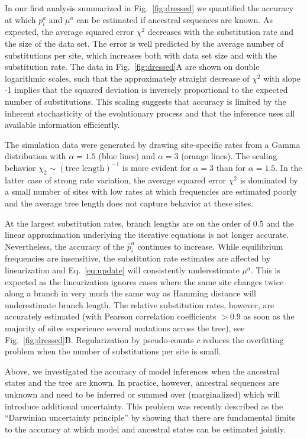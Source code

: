 \documentclass[aps,rmp,twocolumn,linenumbers]{revtex4-1}
\newcommand{\eqp}{p}
\newcommand{\pc}{c}
\begin{document}
In our first analysis summarized in Fig.~\ref{fig:dressed} we quantified the accuracy at which $\eqp_i^a$ and $\mu^a$ can be estimated if ancestral sequences are known.
As expected, the average squared error $\chi^2$ decreases with the substitution rate and the size of the data set.
The error is well predicted by the average number of substitutions per site, which increases both with data set size and with the substitution rate.
The data in Fig.~\ref{fig:dressed}A are shown on double logarithmic scales, such that the approximately straight decrease of $\chi^2$ with slope -1 implies that the squared deviation is inversely proportional to the expected number of substitutions.
This scaling suggests that accuracy is limited by the inherent stochasticity of the evolutionary process and that the inference uses all available information efficiently.

The simulation data were generated by drawing site-specific rates from a Gamma distribution with $\alpha=1.5$ (blue lines) and $\alpha=3$ (orange lines).
The scaling behavior $\chi_2 \sim (\textrm{tree length})^{-1}$ is more evident for $\alpha=3$ than for $\alpha=1.5$.
In the latter case of strong rate variation, the average squared error $\chi^2$ is dominated by a small number of sites with low rates at which frequencies are estimated poorly and the average tree length does not capture behavior at these sites.

At the largest substitution rates, branch lengths are on the order of 0.5 and the linear approximation underlying the iterative equations is not longer accurate.
Nevertheless, the accuracy of the $\hat{\eqp}_i^a$ continues to increase.
While equilibrium frequencies are insensitive, the substitution rate estimates are affected by linearization and Eq.~\ref{eq:update} will consistently underestimate $\mu^a$.
This is expected as the linearization ignores cases where the same site changes twice along a branch in very much the same way as Hamming distance will underestimate branch length.
The relative substitution rates, however, are accurately estimated (with Pearson correlation coefficients $>0.9$ as soon as the majority of sites experience several mutations across the tree), see Fig.~\ref{fig:dressed}B.
Regularization by pseudo-counts $\pc$ reduces the overfitting problem when the number of substitutions per site is small.

Above, we investigated the accuracy of model inferences when the ancestral states and the tree are known.
In practice, however, ancestral sequences are unknown and need to be inferred or summed over (marginalized) which will introduce additional uncertainty.
This problem was recently described as the ``Darwinian uncertainty principle'' by \citet{gascuel_darwinian_2020} showing that there are fundamental limits to the accuracy at which  model and ancestral states can be estimated jointly.
\end{document}
